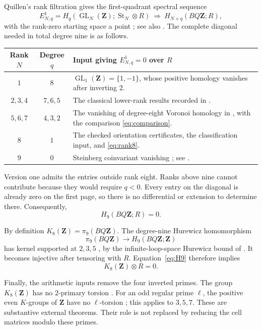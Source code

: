 \documentclass[11pt,a4paper]{article}
\numberwithin{equation}{section}
\theoremstyle{definition}
\theoremstyle{remark}
\newcommand{\Z}{\mathbf Z}
\newcommand{\GL}{\operatorname{GL}}
\newcommand{\St}{\operatorname{St}}
\newcommand{\BQ}{BQ\Z}
\begin{document}
Quillen's rank filtration gives the first-quadrant spectral sequence
\begin{equation}\label{eq:rankfiltration}
 E^1_{N,q}=H_q(\GL_N(\Z);\St_N\otimes R)
 \ \Longrightarrow\ H_{N+q}(\BQ;R),
\end{equation}
with the rank-zero starting space a point
\cite[Theorem~3]{Quillen}; see also
\cite[\S6, proof of Proposition~6.1]{DEKM}.
The complete diagonal needed in total degree nine is as follows.
\begin{center}
\small
\begin{tabularx}{\linewidth}{@{}c c X@{}}
\toprule
Rank \(N\)&Degree \(q\)&Input giving \(E^1_{N,q}=0\) over \(R\)\\
\midrule
\(1\)&\(8\)&
\(\GL_1(\Z)=\{1,-1\}\), whose positive homology vanishes after
inverting \(2\).\\
\(2,3,4\)&\(7,6,5\)&
The classical lower-rank results recorded in
\cite[Table~5]{DEKM}.\\
\(5,6,7\)&\(4,3,2\)&
The vanishing of degree-eight Voronoi homology in
\cite[Theorem~4.3]{EVGS}, with the comparison \eqref{eq:comparison}.\\
\(8\)&\(1\)&
The checked orientation certificates, the classification input,
and \eqref{eq:rank8}.\\
\(9\)&\(0\)&
Steinberg coinvariant vanishing
\cite[Theorem~1.3]{LS}; see \cite[Remark~6.2]{DEKM}.\\
\bottomrule
\end{tabularx}
\end{center}
Version one admits the entries outside rank eight.
Ranks above nine cannot contribute because they would require
\(q<0\). Every entry on the diagonal is already zero on the first
page, so there is no differential or extension to determine there.
Consequently,
\begin{equation}\label{eq:H9}
 H_9(\BQ;R)=0.
\end{equation}

By definition \(K_8(\Z)=\pi_9(\BQ)\).
The degree-nine Hurewicz homomorphism
\[
 \pi_9(\BQ)\longrightarrow H_9(\BQ;\Z)
\]
has kernel supported at \(2,3,5\)
\cite[Proposition~6.3]{DEKM}, by the infinite-loop-space
Hurewicz bound of \cite[Theorem~1.5]{Arlettaz}.
It becomes injective after tensoring with \(R\).
Equation~\eqref{eq:H9} therefore implies
\begin{equation}\label{eq:localizedK}
 K_8(\Z)\otimes R=0.
\end{equation}

Finally, the arithmetic inputs remove the four inverted primes.
The group \(K_8(\Z)\) has no \(2\)-primary torsion
\cite[VI, Corollary~9.8]{Weibel}.
For an odd regular prime \(\ell\), the positive even \(K\)-groups of
\(\Z\) have no \(\ell\)-torsion
\cite[VI, Proposition~10.5]{Weibel}; this applies to \(3,5,7\).
These are substantive external theorems. Their role is not replaced
by reducing the cell matrices modulo these primes.
\end{document}
